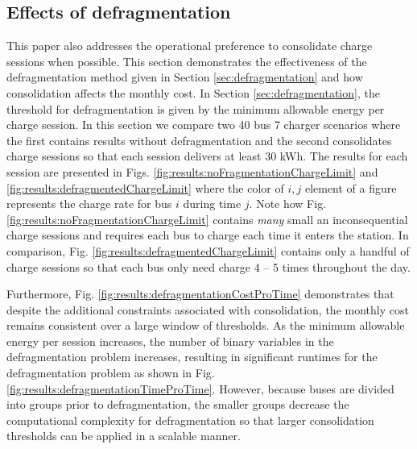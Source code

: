 \subsection{Effects of defragmentation}
This paper also addresses the operational preference to consolidate charge sessions when possible. This section demonstrates the effectiveness of the defragmentation method given in Section \ref{sec:defragmentation} and how consolidation affects the monthly cost. In Section \ref{sec:defragmentation}, the threshold for defragmentation is given by the minimum allowable energy per charge session. In this section we compare two 40 bus 7 charger scenarios where the first contains results without defragmentation and the second consolidates charge sessions so that each session delivers at least 30 kWh. The results for each session are presented in Figs. \ref{fig:results:noFragmentationChargeLimit} and \ref{fig:results:defragmentedChargeLimit} where the color of $i,j$ element of a figure represents the charge rate for bus $i$ during time $j$. Note how Fig. \ref{fig:results:noFragmentationChargeLimit} contains {\it many} small an inconsequential charge sessions and requires each bus to charge each time it enters the station. In comparison, Fig. \ref{fig:results:defragmentedChargeLimit} contains only a handful of charge sessions so that each bus only need charge 4 -- 5 times throughout the day.  
\par Furthermore, Fig. \ref{fig:results:defragmentationCostProTime} demonstrates that despite the additional constraints associated with consolidation, the monthly cost remains consistent over a large window of thresholds. As the minimum allowable energy per session increases, the number of binary variables in the defragmentation problem increases, resulting in significant runtimes for the defragmentation problem as shown in Fig. \ref{fig:results:defragmentationTimeProTime}. However, because buses are divided into groups prior to defragmentation, the smaller groups decrease the computational complexity for defragmentation so that larger consolidation thresholds can be applied in a scalable manner. 

 


